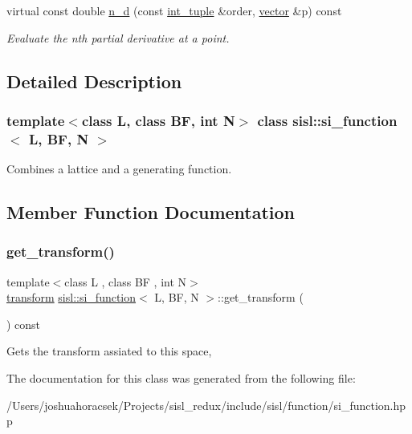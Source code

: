 \begin{DoxyCompactItemize}
\mbox{\label{classsisl_1_1si__function_af7aa5368f0b296321ad1f88eb6453083}} 
virtual const double \hyperlink{classsisl_1_1si__function_af7aa5368f0b296321ad1f88eb6453083}{n\+\_\+d} (const \hyperlink{namespacesisl_adc492e1c166a136d08b283394d81cd71}{int\+\_\+tuple} \&order, \hyperlink{namespacesisl_a2069bd5374a9be042ff3ce3306d41e1a}{vector} \&p) const
\begin{DoxyCompactList}\small\item\em Evaluate the n\textquotesingle{}th partial derivative at a point. \end{DoxyCompactList}\end{DoxyCompactItemize}


\subsection{Detailed Description}
\subsubsection*{template$<$class L, class BF, int N$>$\newline
class sisl\+::si\+\_\+function$<$ L, B\+F, N $>$}

Combines a lattice and a generating function. 



\subsection{Member Function Documentation}
\mbox{\label{classsisl_1_1si__function_a8e173df1adf445d4939f142846186364}} 
\subsubsection{\texorpdfstring{get\+\_\+transform()}{get\_transform()}}
{\footnotesize\ttfamily template$<$class L , class BF , int N$>$ \\
\hyperlink{namespacesisl_a2ef12d285ca3e626c05abbdec1f8a679}{transform} \hyperlink{classsisl_1_1si__function}{sisl\+::si\+\_\+function}$<$ L, BF, N $>$\+::get\+\_\+transform (\begin{DoxyParamCaption}{ }\end{DoxyParamCaption}) const\hspace{0.3cm}{\ttfamily [inline]}}

Gets the transform assiated to this space, 

The documentation for this class was generated from the following file\+:\begin{DoxyCompactItemize}
\item 
/\+Users/joshuahoracsek/\+Projects/sisl\+\_\+redux/include/sisl/function/si\+\_\+function.\+hpp\end{DoxyCompactItemize}
